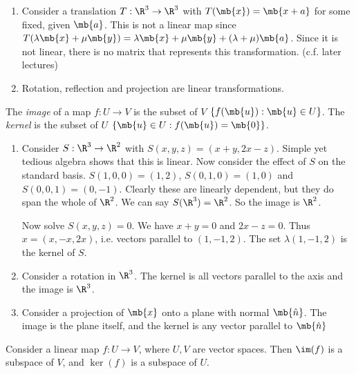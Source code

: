 \documentclass[a4paper]{article}
\begin{document}
\begin{eg}\leavevmode
  \begin{enumerate}
  \item Consider a translation $T:\R^3 \to \R^3$ with $T(\mb{x}) = \mb{x + a}$ for some fixed, given $\mb{a}$. This is not a linear map since $T(\lambda\mb{x} + \mu\mb{y}) = \lambda \mb{x} + \mu \mb{y} + (\lambda + \mu)\mb{a}$. Since it is not linear, there is no matrix that represents this transformation. (c.f. later lectures)
  \item Rotation, reflection and projection are linear transformations.
  \end{enumerate}
\end{eg}

\begin{defi}
  The \emph{image} of a map $f: U\to V$ is the subset of $V$ $\{f(\mb{u}): \mb{u}\in U\}$. The \emph{kernel} is the subset of $U$ $\{\mb{u}\in U: f(\mb{u}) = \mb{0}\}$.
\end{defi}

\begin{eg}\leavevmode
  \begin{enumerate}
  \item Consider $S: \R^3 \to \R^2$ with $S(x, y, z) = (x + y, 2x - z)$. Simple yet tedious algebra shows that this is linear.
   Now consider the effect of $S$ on the standard basis. $S(1, 0, 0) = (1, 2)$, $S(0, 1, 0) = (1, 0)$ and $S(0, 0, 1) = (0, -1)$. Clearly these are linearly dependent, but they do span the whole of $\R^2$. We can say $S(\R^3) = \R^2$. So the image is $\R^2$.

   Now solve $S(x, y, z) = 0$. We have $x + y = 0$ and $2x - z = 0$. Thus $x = (x, -x, 2x)$, i.e. vectors parallel to $(1, -1, 2)$. The set $\lambda(1, -1, 2)$ is the kernel of $S$.
   \item Consider a rotation in $\R^3$. The kernel is all vectors parallel to the axis and the image is $\R^3$.
   \item Consider a projection of $\mb{x}$ onto a plane with normal $\mb{\hat n}$. The image is the plane itself, and the kernel is any vector parallel to $\mb{\hat n}$
  \end{enumerate}
\end{eg}

\begin{thm}
  Consider a linear map $f: U\to V$, where $U, V$ are vector spaces. Then $\im (f)$ is a subspace of $V$, and $\ker (f)$ is a subspace of $U$.
\end{thm}
\end{document}
